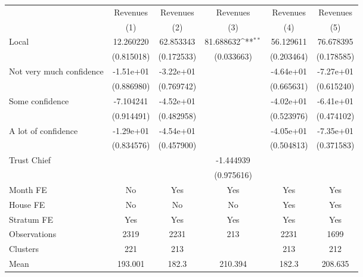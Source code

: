 {
\def\sym#1{\ifmmode^{#1}\else\(^{#1}\)\fi}
\begin{tabular}{l*{5}{c}}
\toprule
                &\multicolumn{1}{c}{Revenues}&\multicolumn{1}{c}{Revenues}&\multicolumn{1}{c}{Revenues}&\multicolumn{1}{c}{Revenues}&\multicolumn{1}{c}{Revenues}\\
                &\multicolumn{1}{c}{(1)}         &\multicolumn{1}{c}{(2)}         &\multicolumn{1}{c}{(3)}         &\multicolumn{1}{c}{(4)}         &\multicolumn{1}{c}{(5)}         \\
\midrule
Local           &12.260220         &62.853343         &81.688632\sym{**} &56.129611         &76.678395         \\
                &(0.815018)         &(0.172533)         &(0.033663)         &(0.203464)         &(0.178585)         \\
Not very much confidence&-1.51e+01         &-3.22e+01         &                  &-4.64e+01         &-7.27e+01         \\
                &(0.886980)         &(0.769742)         &                  &(0.665631)         &(0.615240)         \\
Some confidence &-7.104241         &-4.52e+01         &                  &-4.02e+01         &-6.41e+01         \\
                &(0.914491)         &(0.482958)         &                  &(0.523976)         &(0.474102)         \\
A lot of confidence&-1.29e+01         &-4.54e+01         &                  &-4.05e+01         &-7.35e+01         \\
                &(0.834576)         &(0.457900)         &                  &(0.504813)         &(0.371583)         \\
Trust Chief     &                  &                  &-1.444939         &                  &                  \\
                &                  &                  &(0.975616)         &                  &                  \\
Month FE        &       No         &      Yes         &      Yes         &      Yes         &      Yes         \\
House FE        &       No         &       No         &       No         &      Yes         &      Yes         \\
Stratum FE      &      Yes         &      Yes         &      Yes         &      Yes         &      Yes         \\
\midrule
Observations    &     2319         &     2231         &      213         &     2231         &     1699         \\
Clusters        &      221         &      213         &                  &      213         &      212         \\
Mean            &  193.001         &    182.3         &  210.394         &    182.3         &  208.635         \\
\bottomrule
\end{tabular}
}
